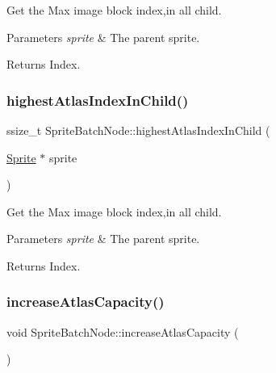Get the Max image block index,in all child.


\begin{DoxyParams}{Parameters}
{\em sprite} & The parent sprite. \\
\hline
\end{DoxyParams}
\begin{DoxyReturn}{Returns}
Index. 
\end{DoxyReturn}
\mbox{\label{classSpriteBatchNode_a35d235f36390aea4f98b05f9f883cc76}} 
\subsubsection{\texorpdfstring{highest\+Atlas\+Index\+In\+Child()}{highestAtlasIndexInChild()}\hspace{0.1cm}{\footnotesize\ttfamily [2/2]}}
{\footnotesize\ttfamily ssize\+\_\+t Sprite\+Batch\+Node\+::highest\+Atlas\+Index\+In\+Child (\begin{DoxyParamCaption}\item[{\hyperlink{classSprite}{Sprite} $\ast$}]{sprite }\end{DoxyParamCaption})}

Get the Max image block index,in all child.


\begin{DoxyParams}{Parameters}
{\em sprite} & The parent sprite. \\
\hline
\end{DoxyParams}
\begin{DoxyReturn}{Returns}
Index. 
\end{DoxyReturn}
\mbox{\label{classSpriteBatchNode_ad76d544ea06e10d6413ab978c868bc70}} 
\subsubsection{\texorpdfstring{increase\+Atlas\+Capacity()}{increaseAtlasCapacity()}\hspace{0.1cm}{\footnotesize\ttfamily [1/2]}}
{\footnotesize\ttfamily void Sprite\+Batch\+Node\+::increase\+Atlas\+Capacity (\begin{DoxyParamCaption}{ }\end{DoxyParamCaption})}

